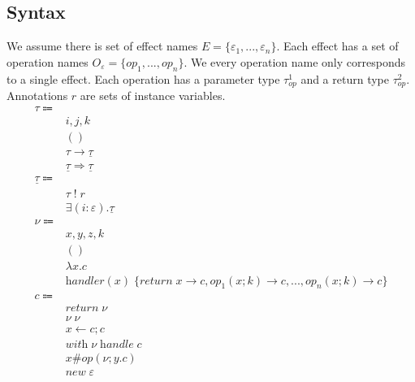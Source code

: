 \documentclass[12pt]{article}
\newcommand\Eff[0]{E}
\newcommand\eff[0]{\varepsilon}
\newcommand\Op[0]{O}
\newcommand\op[0]{op}
\newcommand\pty[1]{\ty^1_{#1}}
\newcommand\rty[1]{\ty^2_{#1}}
\newcommand\ty[0]{\tau}
\newcommand\tunit[0]{()}
\newcommand\tarr[2]{#1 \rightarrow #2}
\newcommand\thandler[2]{#1 \Rightarrow #2}
\newcommand\cty[0]{\underline{\ty}}
\newcommand\aty[2]{#1 \; ! \; #2}
\newcommand\texists[3]{\exists(#1:#2) . #3}
\newcommand\val[0]{\nu}
\newcommand\vunit[0]{()}
\newcommand\vabs[2]{\lambda #1 . #2}
\newcommand\vhandleri[2]{\textit{handler} ( #1 ) \; \{#2\}}
\newcommand\vhandlerci[1]{\vhandleri{#1}{
	\textit{return} \; x \rightarrow \comp,
	\op_1(x ; k) \rightarrow \comp,
	...,
	\op_n(x ; k) \rightarrow \comp
}}
\newcommand\comp[0]{c}
\newcommand\creturn[1]{\textit{return} \; #1}
\newcommand\capp[2]{#1 \; #2}
\newcommand\cdo[3]{#1 \leftarrow #2 ; #3}
\newcommand\copi[5]{#1 \# #2(#3 ; #4 . #5)}
\newcommand\chandle[2]{\textit{with} \; #1 \; \textit{handle} \; #2}
\newcommand\cnew[1]{\textit{new} \; #1}
\begin{document}
\subsection{Syntax}
We assume there is set of effect names $\Eff = \{ \eff_1, ..., \eff_n \}$.
Each effect has a set of operation names $\Op_\eff = \{ \op_1, ..., \op_n \}$.
We every operation name only corresponds to a single effect.
Each operation has a parameter type $\pty{\op}$ and a return type $\rty{\op}$.
Annotations $r$ are sets of instance variables.
\\
\begin{align*}
	\ty \Coloneqq 				& 											\tag{value types} \\
									& i, j, k									\tag{instance variables} \\
									& \tunit									\tag{unit type} \\
									& \tarr{\ty}{\cty}						\tag{type of functions} \\
									& \thandler{\cty}{\cty}				\tag{type of handlers} \\
	\cty \Coloneqq 			& 											\tag{computation types} \\
									& \aty{\ty}{r}							\tag{annotated type} \\
									& \texists{i}{\eff}{\cty}				\tag{existential} \\
	\val \Coloneqq			&											\tag{values} \\
									& x, y, z, k								\tag{variables} \\
									& \vunit									\tag{unit value} \\
									& \vabs{x}{\comp}					\tag{abstraction} \\
									& \vhandlerci{x}						\tag{handler} \\
	\comp \Coloneqq		&											\tag{computations} \\
									& \creturn{\val}						\tag{return value as computation} \\
									& \capp{\val}{\val}					\tag{application} \\
									& \cdo{x}{\comp}{\comp}			\tag{sequencing} \\
									& \chandle{\val}{\comp}			\tag{handler application} \\
									& \copi{x}{\op}{\val}{y}{\comp}	\tag{operation call} \\
									& \cnew{\eff}							\tag{instance creation} \\
\end{align*}
\end{document}
